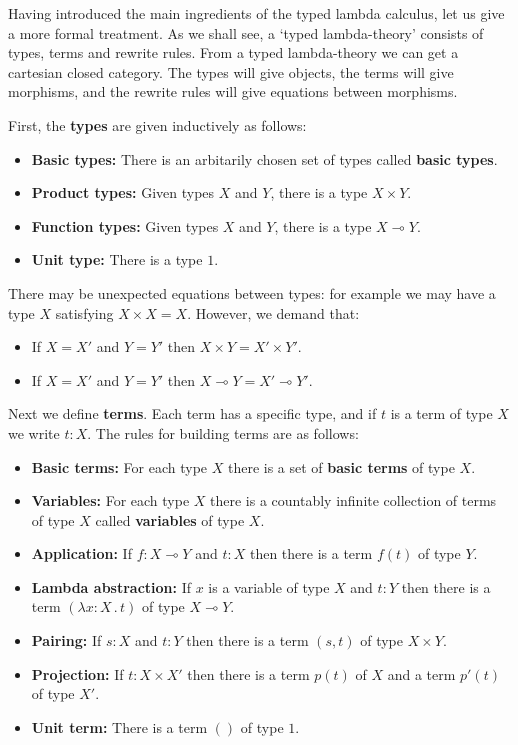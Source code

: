 \documentclass[12pt,twoside,openright]{report}
\newcommand{\lhom}{\multimap}
\begin{document}
Having introduced the main ingredients of the typed lambda calculus, let us give a more formal treatment.  As we shall see, a `typed lambda-theory' consists of types, terms and rewrite rules.  From a typed lambda-theory we can get a cartesian closed category.  The types will give objects, the terms will give morphisms, and the rewrite rules will give equations between morphisms.

First, the {\bf types} are given inductively as follows:
\begin{itemize}
\item {\bf Basic types:}
There is an arbitarily chosen set of types called {\bf basic types}.
\item {\bf Product types:}
Given types $X$ and $Y$, there is a type $X \times Y$.
\item {\bf Function types:}
Given types $X$ and $Y$, there is a type $X \lhom Y$.
\item {\bf Unit type:} There is a type $1$.
\end{itemize}
There may be unexpected equations between types: for example we may have a type $X$ satisfying $X \times X = X$.  However, we demand that:
\begin{itemize}
\item If $X = X'$ and $Y = Y'$ then $X \times Y = X' \times Y'$.
\item If $X = X'$ and $Y = Y'$ then $X \lhom Y = X' \lhom Y'$.
\end{itemize}

Next we define {\bf terms}.  Each term has a specific type, and if $t$
is a term of type $X$ we write $t\!:\!X$.  The rules for building terms are as follows:
\begin{itemize}
  \item {\bf Basic terms:} For each type $X$ there is a set of
{\bf basic terms} of type $X$.
  \item {\bf Variables:} For each type $X$ there is a countably infinite collection of terms of type $X$ called {\bf variables}
of type $X$.
  \item {\bf Application:} 
If $f:X \lhom Y$ and $t:X$ then there is a term $f(t)$ of type
$Y$.
  \item {\bf Lambda abstraction:} 
If $x$ is a variable of type $X$ and $t:Y$ 
then there is a term $(\lambda x\! : \!X \, .\, t)$ of type $X \lhom Y$.
  \item {\bf Pairing:} If $s:X$ and $t:Y$ then there is a term $(s,t)$ of type $X \times Y$.
  \item {\bf Projection:}
If $t:X \times X'$ then there is a term $p(t)$ of $X$ and a term
$p'(t)$ of type $X'$.
  \item {\bf Unit term:} There is a term $()$ of type $1$.
\end{itemize}
\end{document}

